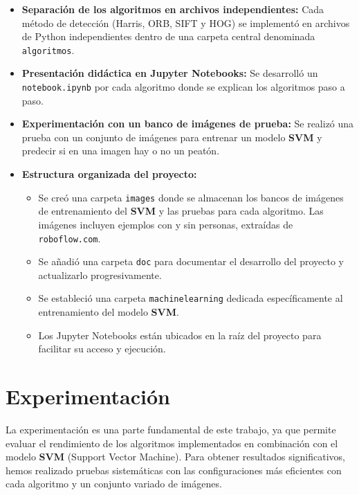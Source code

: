 \documentclass[a4paper]{article}
\begin{document}
\begin{itemize}
\item \textbf{Separación de los algoritmos en archivos independientes:} Cada método de detección (Harris, ORB, SIFT y HOG) se implementó en archivos de Python independientes dentro de una carpeta central denominada \texttt{algoritmos}.
\item \textbf{Presentación didáctica en Jupyter Notebooks:} Se desarrolló un \texttt{notebook.ipynb} por cada algoritmo donde se explican los algoritmos paso a paso.
\item \textbf{Experimentación con un banco de imágenes de prueba:} Se realizó una prueba con un conjunto de imágenes para entrenar un modelo \textbf{SVM} y predecir si en una imagen hay o no un peatón.
\item \textbf{Estructura organizada del proyecto:}  
    \begin{itemize}
        \item Se creó una carpeta \texttt{images} donde se almacenan los bancos de imágenes de entrenamiento del \textbf{SVM} y las pruebas para cada algoritmo. Las imágenes incluyen ejemplos con y sin personas, extraídas de \texttt{roboflow.com}.
        \item Se añadió una carpeta \texttt{doc} para documentar el desarrollo del proyecto y actualizarlo progresivamente.
        \item Se estableció una carpeta \texttt{machinelearning} dedicada específicamente al entrenamiento del modelo \textbf{SVM}.
        \item Los Jupyter Notebooks están ubicados en la raíz del proyecto para facilitar su acceso y ejecución.
    \end{itemize}
\end{itemize}

\newpage

\section{Experimentación}

La experimentación es una parte fundamental de este trabajo, ya que permite evaluar el rendimiento de los algoritmos implementados en combinación con el modelo \textbf{SVM} (Support Vector Machine). 
Para obtener resultados significativos, hemos realizado pruebas sistemáticas con las configuraciones más eficientes con cada algoritmo y un conjunto variado de imágenes.
\par \hspace{1cm}
\end{document}
